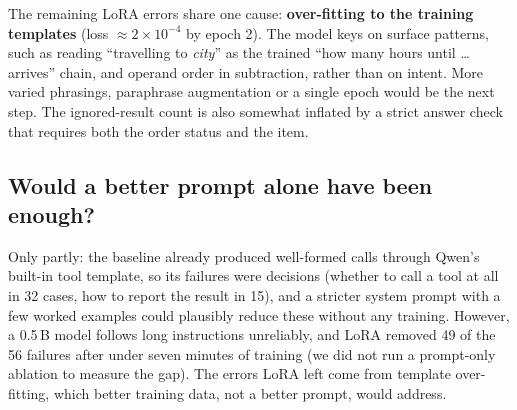 \documentclass[12pt,a4paper]{article}
\begin{document}
\vspace{4pt}
The remaining LoRA errors share one cause: \textbf{over-fitting to the training templates} (loss $\approx 2\times10^{-4}$ by epoch 2). The model keys on surface patterns, such as reading ``travelling to \textit{city}'' as the trained ``how many hours until \ldots{} arrives'' chain, and operand order in subtraction, rather than on intent. More varied phrasings, paraphrase augmentation or a single epoch would be the next step. The ignored-result count is also somewhat inflated by a strict answer check that requires both the order status and the item.

\subsection{Would a better prompt alone have been enough?}
Only partly: the baseline already produced well-formed calls through Qwen's built-in tool template, so its failures were decisions (whether to call a tool at all in 32 cases, how to report the result in 15), and a stricter system prompt with a few worked examples could plausibly reduce these without any training. However, a 0.5\,B model follows long instructions unreliably, and LoRA removed 49 of the 56 failures after under seven minutes of training (we did not run a prompt-only ablation to measure the gap). The errors LoRA left come from template over-fitting, which better training data, not a better prompt, would address.

\endgroup
\restoregeometry
\end{document}
